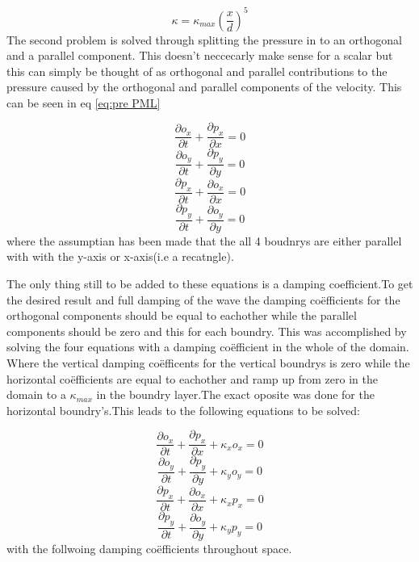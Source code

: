 \documentclass{article}
\begin{document}
\begin{equation}
    \kappa=\kappa_{max}(\frac{x}{d})^5
\end{equation}
The second problem is solved through splitting the pressure in to an orthogonal and a parallel component. This doesn't neccecarly make sense for a scalar but this can simply be thought of as orthogonal and parallel contributions to the pressure caused by the orthogonal and parallel components of the velocity. This can be seen in eq \ref{eq:pre PML}

\begin{equation}
    \frac{\partial o_x}{\partial t}+\frac{\partial p_x}{\partial x}=0
\end{equation}
\begin{equation}
    \frac{\partial o_y}{\partial t}+\frac{\partial p_y}{\partial y}=0
\end{equation}
\begin{equation}
    \frac{\partial p_x}{\partial t}+\frac{\partial o_x}{\partial x}=0
\end{equation}
\begin{equation}
    \frac{\partial p_y}{\partial t}+\frac{\partial o_y}{\partial y}=0
\end{equation}
where the assumptian has been made that the all 4 boudnrys are either parallel with with the y-axis or x-axis(i.e  a recatngle).

The only thing still to be added to these equations is a damping coefficient.To get the desired result and full damping of the wave the damping coëfficients for the orthogonal components should be equal to eachother while the parallel components should be zero and this for each boundry. This was accomplished by solving the four equations with a damping coëfficient in the whole of the domain. Where the vertical damping coëfficents for the vertical boundrys is zero while the horizontal coëfficients are equal to eachother and ramp up from zero in the domain to a $\kappa_{max}$ in the boundry layer.The exact oposite was done for the horizontal boundry's.This leads to the following equations to be solved:

\begin{equation}
    \frac{\partial o_x}{\partial t}+\frac{\partial p_x}{\partial x}+\kappa_x o_x=0
\end{equation}
\begin{equation}
    \frac{\partial o_y}{\partial t}+\frac{\partial p_y}{\partial y}+\kappa_y o_y=0
\end{equation}
\begin{equation}
    \frac{\partial p_x}{\partial t}+\frac{\partial o_x}{\partial x}+\kappa_x p_x=0
\end{equation}
\begin{equation}
    \frac{\partial p_y}{\partial t}+\frac{\partial o_y}{\partial y}+\kappa_y p_y=0
\end{equation}
 with the follwoing damping coëfficients throughout space.
\end{document}
